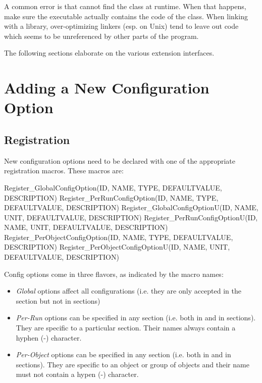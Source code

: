 \begin{note}
A common error is that {\opp} cannot find the class at runtime. When that
happens, make sure the executable actually contains the code of the class.
When linking with a library, over-optimizing linkers (esp. on Unix) tend to
leave out code which seems to be unreferenced by other parts of the
program.
\end{note}

The following sections elaborate on the various extension interfaces.


\section{Adding a New Configuration Option}
\label{sec:plugin-exts:configoption}

\subsection{Registration}
\label{sec:plugin-exts:configoption:registration}

New configuration options need to be declared with one of the appropriate
registration macros. These macros are:

\begin{cpp}
Register_GlobalConfigOption(ID, NAME, TYPE, DEFAULTVALUE, DESCRIPTION)
Register_PerRunConfigOption(ID, NAME, TYPE, DEFAULTVALUE, DESCRIPTION)
Register_GlobalConfigOptionU(ID, NAME, UNIT, DEFAULTVALUE, DESCRIPTION)
Register_PerRunConfigOptionU(ID, NAME, UNIT, DEFAULTVALUE, DESCRIPTION)
Register_PerObjectConfigOption(ID, NAME, TYPE, DEFAULTVALUE, DESCRIPTION)
Register_PerObjectConfigOptionU(ID, NAME, UNIT, DEFAULTVALUE, DESCRIPTION)
\end{cpp}

Config options come in three flavors, as indicated by the macro names:

\begin{itemize}
  \item \textit{Global} options affect all configurations (i.e. they are
      only accepted in the \ttt{[General]} section but not in
       sections)
  \item \textit{Per-Run} options can be specified in any section
      (i.e. both in \ttt{[General]} and in  sections).
      They are specific to a particular section. Their names always contain
      a hyphen (-) character.
  \item \textit{Per-Object} options can be specified in any section
      (i.e. both in \ttt{[General]} and in  sections).
      They are specific to an object or group of objects and their name must
      not contain a hypen (-) character.
\end{itemize}

